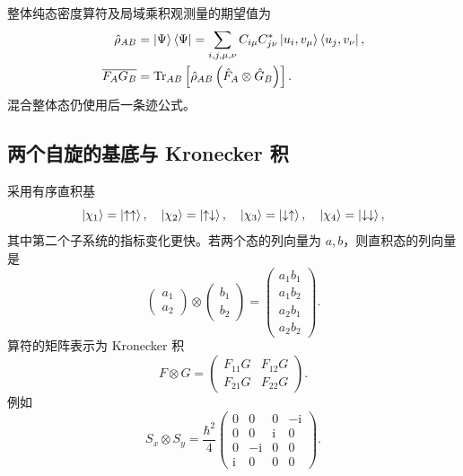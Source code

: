 整体纯态密度算符及局域乘积观测量的期望值为
\begin{align}
\hat\rho_{AB}&=\Ket{\Psi}\Bra{\Psi}
=\sum_{i,j,\mu,\nu}C_{i\mu}C_{j\nu}^*
\Ket{u_i,v_\mu}\Bra{u_j,v_\nu},\\
\overline{F_AG_B}&=\mathrm{Tr}_{AB}\left[\hat\rho_{AB}
\left(\hat F_A\otimes\hat G_B\right)\right].
\end{align}
混合整体态仍使用后一条迹公式。

\subsection{两个自旋的基底与 Kronecker 积}
采用有序直积基
\begin{equation}
\Ket{\chi_1}=\Ket{\uparrow\uparrow},\quad
\Ket{\chi_2}=\Ket{\uparrow\downarrow},\quad
\Ket{\chi_3}=\Ket{\downarrow\uparrow},\quad
\Ket{\chi_4}=\Ket{\downarrow\downarrow},
\end{equation}
其中第二个子系统的指标变化更快。若两个态的列向量为 $a,b$，则直积态的列向量是
\begin{equation}
\left(\begin{matrix}a_1\\a_2\end{matrix}\right)\otimes
\left(\begin{matrix}b_1\\b_2\end{matrix}\right)
=\left(\begin{matrix}a_1b_1\\a_1b_2\\a_2b_1\\a_2b_2\end{matrix}\right).
\end{equation}
算符的矩阵表示为 Kronecker 积
\begin{equation}
F\otimes G=\left(\begin{matrix}F_{11}G&F_{12}G\\F_{21}G&F_{22}G\end{matrix}\right).
\end{equation}
例如
\begin{equation}
S_x\otimes S_y=\frac{\hbar^2}{4}
\left(\begin{matrix}0&0&0&-\mathrm{i}\\0&0&\mathrm{i}&0\\
0&-\mathrm{i}&0&0\\\mathrm{i}&0&0&0\end{matrix}\right).
\end{equation}

